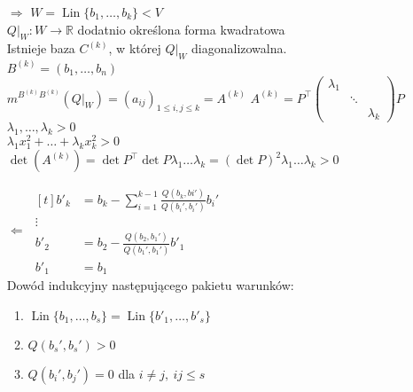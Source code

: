 \begin{dd} \hfill
    \begin{itemize} 
        \item[$\Rightarrow$]$W = \operatorname{Lin} \{b_1,\ldots,b_k\} < V$ \\ 
                            $Q|_W: W \to \mathbb R$ dodatnio określona forma kwadratowa\\
                            Istnieje baza $C^{(k)}$, w której $Q|_W$ diagonalizowalna. \\
                            $B^{(k)}=(b_1,\ldots,b_n)$ \\ 
                            $m^{B^{(k)}B^{(k)}}(Q|_W)=(a_{ij})_{1 \le i,j\le k}=A^{(k)}$
                            $A^{(k)} = P^\top 
                            \begin{pmatrix} \lambda_1 & & \\ & \ddots & \\ & & \lambda_k
                            \end{pmatrix} P$ \\ 
                            $\lambda_1, \ldots,\lambda_k > 0$ \\ 
                            $\lambda_1 x_1^2 + \ldots + \lambda_k x_k^2 > 0$  
                            $\det(A^{(k)}) = \det P^\top \det P \lambda_1\dots\lambda_k=
                            (\det P)^2 \lambda_1 \dots \lambda_k > 0$
        \item[$\Leftarrow$]$\begin{aligned}[t] 
                            b'_k &= b_k - \sum\limits_{i =1}^{k-1} \frac{Q(b_k,bi')}{Q(
                            b_i',b_i')} b_i'\\ 
                            \vdots \\
                            b'_2 &= b_2 - \frac{Q(b_2,b_1')}{Q(b_1',b_1')} b'_1 \\
                            b'_1 &= b_1
                            \end{aligned}$ \\ 
                            Dowód indukcyjny następującego pakietu warunków: 
                            \begin{enumerate}
                                \item $\operatorname{Lin}\{b_1,\ldots,b_s\} = 
                                       \operatorname{Lin}\{b'_1,\ldots,b'_s\}$ 
                                \item $Q(b_s',b_s') > 0$ 
                                \item $Q(b_i',b_j') = 0$ dla $i \neq j,\ i j \le s$

\end{enumerate}
\end{itemize}
\end{dd}
